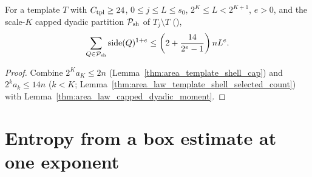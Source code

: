 \begin{lemma}
    \label{thm:area_template_weighted_shell}
    \leanok
    For a template $T$ with $C_{\rm tpl}\ge24$, $0\le j\le L\le s_0$, $2^K\le L<2^{K+1}$, $e>0$, and the scale-$K$ capped dyadic partition $\mathcal P_{\rm sh}$ of $T_j\setminus T$ (\cite[Lemma~9.4]{OpenAI2026AreaLaw}),
    \begin{align}
        \sum_{Q\in\mathcal P_{\rm sh}} \operatorname{side}(Q)^{1+e}
        \le \left(2+\frac{14}{2^e-1}\right)nL^e. \label{eq:template_shell_cover}
    \end{align}
\end{lemma}
\begin{proof}\leanok
    Combine $2^Ka_K\le2n$ (Lemma~\ref{thm:area_template_shell_cap}) and $2^ka_k\le14n$ ($k<K$; Lemma~\ref{thm:area_law_template_shell_selected_count}) with Lemma~\ref{thm:area_law_capped_dyadic_moment}.
\end{proof}

\section{Entropy from a box estimate at one exponent}

